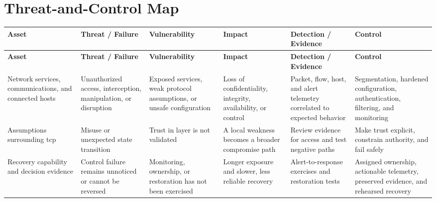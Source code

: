 \documentclass[11pt,letterpaper]{article}
\begin{document}
\section*{Threat-and-Control Map}
\begingroup\scriptsize\setlength{\tabcolsep}{2pt}
\begin{longtable}{>{\raggedright\arraybackslash}p{}>{\raggedright\arraybackslash}p{}>{\raggedright\arraybackslash}p{}>{\raggedright\arraybackslash}p{}>{\raggedright\arraybackslash}p{}>{\raggedright\arraybackslash}p{}}
\toprule\rowcolor{Navy}\color{white}\textbf{Asset} & \color{white}\textbf{Threat / Failure} & \color{white}\textbf{Vulnerability} & \color{white}\textbf{Impact} & \color{white}\textbf{Detection / Evidence} & \color{white}\textbf{Control}\\\midrule
\endfirsthead
\toprule\rowcolor{Navy}\color{white}\textbf{Asset} & \color{white}\textbf{Threat / Failure} & \color{white}\textbf{Vulnerability} & \color{white}\textbf{Impact} & \color{white}\textbf{Detection / Evidence} & \color{white}\textbf{Control}\\\midrule
\endhead
Network services, communications, and connected hosts & Unauthorized access, interception, manipulation, or disruption & Exposed services, weak protocol assumptions, or unsafe configuration & Loss of confidentiality, integrity, availability, or control & Packet, flow, host, and alert telemetry correlated to expected behavior & Segmentation, hardened configuration, authentication, filtering, and monitoring\\\midrule
Assumptions surrounding tcp & Misuse or unexpected state transition & Trust in layer is not validated & A local weakness becomes a broader compromise path & Review evidence for access and test negative paths & Make trust explicit, constrain authority, and fail safely\\\midrule
Recovery capability and decision evidence & Control failure remains unnoticed or cannot be reversed & Monitoring, ownership, or restoration has not been exercised & Longer exposure and slower, less reliable recovery & Alert-to-response exercises and restoration tests & Assigned ownership, actionable telemetry, preserved evidence, and rehearsed recovery\\\midrule
\bottomrule
\end{longtable}
\endgroup
\end{document}
